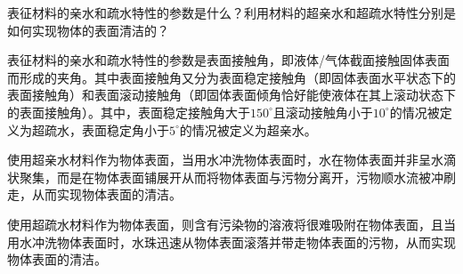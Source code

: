 \documentclass{assignment}
\begin{document}
\begin{ti}
    表征材料的亲水和疏水特性的参数是什么？利用材料的超亲水和超疏水特性分别是如何实现物体的表面清洁的？
\end{ti}
\begin{da}
    表征材料的亲水和疏水特性的参数是表面接触角，即液体/气体截面接触固体表面而形成的夹角。其中表面接触角又分为表面稳定接触角（即固体表面水平状态下的表面接触角）和表面滚动接触角（即固体表面倾角恰好能使液体在其上滚动状态下的表面接触角）。其中，表面稳定接触角大于$150^{\circ}$且滚动接触角小于$10^{\circ}$的情况被定义为超疏水，表面稳定角小于$5^{\circ}$的情况被定义为超亲水。

    使用超亲水材料作为物体表面，当用水冲洗物体表面时，水在物体表面并非呈水滴状聚集，而是在物体表面铺展开从而将物体表面与污物分离开，污物顺水流被冲刷走，从而实现物体表面的清洁。

    使用超疏水材料作为物体表面，则含有污染物的溶液将很难吸附在物体表面，且当用水冲洗物体表面时，水珠迅速从物体表面滚落并带走物体表面的污物，从而实现物体表面的清洁。
\end{da}
\end{document}
